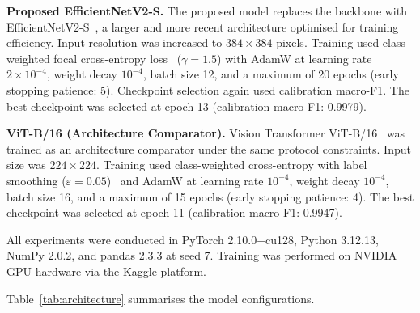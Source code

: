 \documentclass[conference]{IEEEtran}
\begin{document}
\textbf{Proposed EfficientNetV2-S.}
The proposed model replaces the backbone with EfficientNetV2-S~\cite{tan2021efficientnetv2},
a larger and more recent architecture optimised for training efficiency. Input
resolution was increased to $384\times384$ pixels. Training used class-weighted
focal cross-entropy loss~\cite{lin2017focal} ($\gamma=1.5$) with AdamW at
learning rate $2\times10^{-4}$, weight decay $10^{-4}$, batch size 12, and a
maximum of 20 epochs (early stopping patience: 5). Checkpoint selection again
used calibration macro-F1. The best checkpoint was selected at epoch 13
(calibration macro-F1: 0.9979).

\textbf{ViT-B/16 (Architecture Comparator).}
Vision Transformer ViT-B/16~\cite{dosovitskiy2021image} was trained as an
architecture comparator under the same protocol constraints. Input size was
$224\times224$. Training used class-weighted cross-entropy with label smoothing
($\varepsilon=0.05$)~\cite{szegedy2016rethinking} and AdamW at learning rate
$10^{-4}$, weight decay $10^{-4}$, batch size 16, and a maximum of 15 epochs
(early stopping patience: 4). The best checkpoint was selected at epoch 11
(calibration macro-F1: 0.9947).

All experiments were conducted in PyTorch 2.10.0+cu128, Python 3.12.13,
NumPy 2.0.2, and pandas 2.3.3 at seed 7. Training was performed on
NVIDIA GPU hardware via the Kaggle platform.

Table~\ref{tab:architecture} summarises the model configurations.
\end{document}
